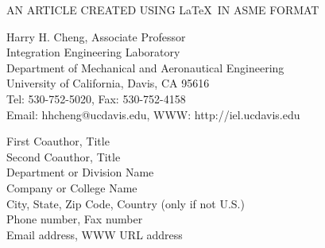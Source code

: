 \begin{center}
{\footnotesize{\hvb
AN ARTICLE CREATED USING \LaTeX\ IN ASME FORMAT\\
}}

\vspace{10pt}
\setlength{\baselineskip}{11pt}

{\footnotesize
{\hvb Harry H. Cheng}, {\hv Associate Professor} \\
{\hv
Integration Engineering Laboratory\\
Department of Mechanical and Aeronautical Engineering \\
University of California, Davis, CA 95616\\
Tel: 530-752-5020, Fax: 530-752-4158\\ 
Email: hhcheng@ucdavis.edu, WWW: http://iel.ucdavis.edu\\
}}

\vspace{10pt}
{\footnotesize
{\hvb First Coauthor}, {\hv Title} \\
{\hvb Second Coauthor}, {\hv Title} \\
{\hv
Department or Division Name \\
Company or College Name\\
City, State, Zip Code, Country (only if not U.S.)\\
Phone number, Fax number \\ 
Email address, WWW URL address\
}}


\end{center}

